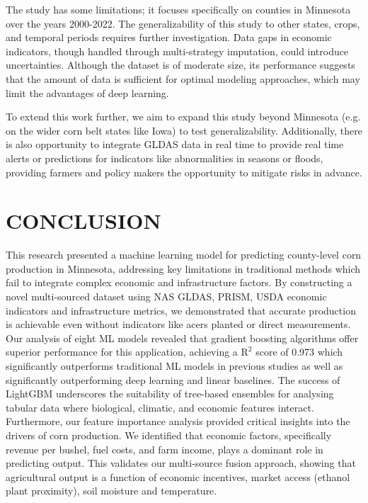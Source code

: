 \documentclass[10pt,twocolumn]{article}
\begin{document}
The study has some limitations; it focuses specifically on counties in Minnesota over the years 2000-2022. The generalizability of this study to other states, crops, and temporal periods requires further investigation. Data gaps in economic indicators, though handled through multi-strategy imputation, could introduce uncertainties. Although the dataset is of moderate size, its performance suggests that the amount of data is sufficient for optimal modeling approaches, which may limit the advantages of deep learning.

To extend this work further, we aim to expand this study beyond Minnesota (e.g. on the wider corn belt states like Iowa) to test generalizability. Additionally, there is also opportunity to integrate GLDAS data in real time to provide real time alerts or predictions for indicators like abnormalities in seasons or floods, providing farmers and policy makers the opportunity to mitigate risks in advance.

\section{CONCLUSION}

This research presented a machine learning model for predicting county-level corn production in Minnesota, addressing key limitations in traditional methods which fail to integrate complex economic and infrastructure factors. By constructing a novel multi-sourced dataset using NAS GLDAS, PRISM, USDA economic indicators and infrastructure metrics, we demonstrated that accurate production is achievable even without indicators like acers planted or direct measurements. Our analysis of eight ML models revealed that gradient boosting algorithms offer superior performance for this application, achieving a $\mathrm{R}^{2}$ score of 0.973 which significantly outperforms traditional ML models in previous studies as well as significantly outperforming deep learning and linear baselines. The success of LightGBM underscores the suitability of tree-based ensembles for analysing tabular data where biological, climatic, and economic features interact. Furthermore, our feature importance analysis provided critical insights into the drivers of corn production. We identified that economic factors, specifically revenue per bushel, fuel costs, and farm income, plays a dominant role in predicting output. This validates our multi-source fusion approach, showing that agricultural output is a function of economic incentives, market access (ethanol plant proximity), soil moisture and temperature.
\end{document}
